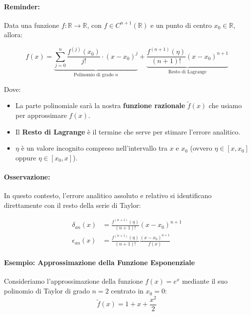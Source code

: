 \documentclass[a4paper,12pt]{article}
\begin{document}
	\paragraph{Reminder:} 
	Data una funzione $f: \mathbb{R} \to \mathbb{R}$, con $f \in C^{n+1}(\mathbb{R})$ e un punto di centro $x_0 \in \mathbb{R}$, allora:
	
	\begin{equation}
		f(x) = \underbrace{\sum_{j=0}^{n} \frac{f^{(j)}(x_0)}{j!} \cdot (x-x_0)^j}_{\text{Polinomio di grado } n} + \underbrace{\frac{f^{(n+1)}(\eta)}{(n+1)!} (x-x_0)^{n+1}}_{\text{Resto di Lagrange}}
	\end{equation}
	
	Dove:
	\begin{itemize}
		\item La parte polinomiale sarà la nostra \textbf{funzione razionale} $\tilde{f}(x)$ che usiamo per approssimare $f(x)$.
		\item Il \textbf{Resto di Lagrange} è il termine che serve per stimare l'errore analitico.
		\item $\eta$ è un valore incognito compreso nell'intervallo tra $x$ e $x_0$ (ovvero $\eta \in [x, x_0]$ oppure $\eta \in [x_0, x]$).
	\end{itemize}
	
	\paragraph{Osservazione:}
	In questo contesto, l'errore analitico assoluto e relativo si identificano direttamente con il resto della serie di Taylor:
	
	\begin{tcolorbox}[colback=blue!5!white, colframe=blue!75!black]
		\begin{align}
			\delta_{an}(x) &= \frac{f^{(n+1)}(\eta)}{(n+1)!} (x-x_0)^{n+1} \\
			\epsilon_{an}(x) &= \frac{f^{(n+1)}(\eta)}{(n+1)!} \frac{(x-x_0)^{n+1}}{f(x)}
		\end{align}
	\end{tcolorbox}
	\paragraph{Esempio: Approssimazione della Funzione Esponenziale}
	
	Consideriamo l'approssimazione della funzione $f(x) = e^x$ mediante il suo polinomio di Taylor di grado $n=2$ centrato in $x_0=0$:
	\[ \tilde{f}(x) = 1 + x + \frac{x^2}{2} \]
	
\end{document}
